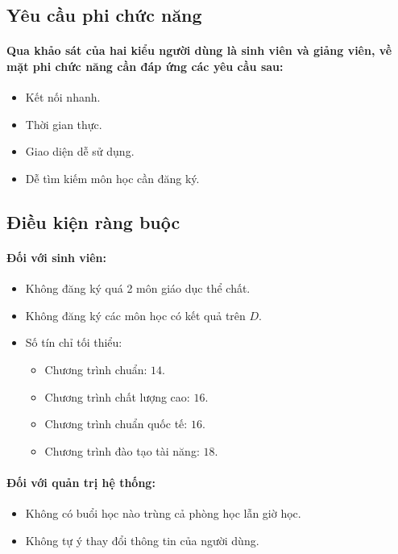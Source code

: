 \documentclass{article}
\begin{document}
  \subsection{Yêu cầu phi chức năng}
    \paragraph{
      \textnormal{
        Qua khảo sát của hai kiểu người dùng là sinh viên và giảng viên, về mặt phi chức năng cần đáp ứng các yêu cầu sau:
      }
    }
    \begin{itemize}
      \item Kết nối nhanh.
      \item Thời gian thực.
      \item Giao diện dễ sử dụng.
      \item Dễ tìm kiếm môn học cần đăng ký.
    \end{itemize}
  
  \subsection{Điều kiện ràng buộc}
    
    \paragraph{\textnormal{
      Đối với sinh viên:
    }}
    \begin{itemize}
      \item Không đăng ký quá 2 môn giáo dục thể chất.
      \item Không đăng ký các môn học có kết quả trên $D$.
      \item Số tín chỉ tối thiểu:
      \begin{itemize}
        \item Chương trình chuẩn: $14$.
        \item Chương trình chất lượng cao: $16$.
        \item Chương trình chuẩn quốc tế: $16$.
        \item Chương trình đào tạo tài năng: $18$.
      \end{itemize}
    \end{itemize}

    \paragraph{\textnormal{
      Đối với quản trị hệ thống:
    }}
    \begin{itemize}
      \item Không có buổi học nào trùng cả phòng học lẫn giờ học.
      \item Không tự ý thay đổi thông tin của người dùng.
    \end{itemize}
\end{document}
